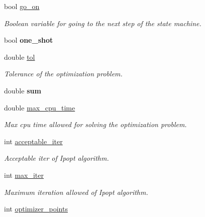 \begin{DoxyCompactItemize}
\mbox{\label{classSuperqComputation_ae4a1ef363106dd0847fbdfd8817153bb}} 
bool \mbox{\hyperlink{classSuperqComputation_ae4a1ef363106dd0847fbdfd8817153bb}{go\+\_\+on}}
\begin{DoxyCompactList}\small\item\em Boolean variable for going to the next step of the state machine. \end{DoxyCompactList}\item 
\mbox{\label{classSuperqComputation_aefd14b0b7c049f47da8bdfcbfae9601c}} 
bool {\bfseries one\+\_\+shot}
\item 
\mbox{\label{classSuperqComputation_af39fa3aba2711650375fda5772876824}} 
double \mbox{\hyperlink{classSuperqComputation_af39fa3aba2711650375fda5772876824}{tol}}
\begin{DoxyCompactList}\small\item\em Tolerance of the optimization problem. \end{DoxyCompactList}\item 
\mbox{\label{classSuperqComputation_ae7b9d547c797db0ce58966617036e048}} 
double {\bfseries sum}
\item 
\mbox{\label{classSuperqComputation_a7c6fad9fa4e90a3c4b43700ac425d784}} 
double \mbox{\hyperlink{classSuperqComputation_a7c6fad9fa4e90a3c4b43700ac425d784}{max\+\_\+cpu\+\_\+time}}
\begin{DoxyCompactList}\small\item\em Max cpu time allowed for solving the optimization problem. \end{DoxyCompactList}\item 
\mbox{\label{classSuperqComputation_ae62bf913e73a28fefde3ea86f422e83c}} 
int \mbox{\hyperlink{classSuperqComputation_ae62bf913e73a28fefde3ea86f422e83c}{acceptable\+\_\+iter}}
\begin{DoxyCompactList}\small\item\em Acceptable iter of Ipopt algorithm. \end{DoxyCompactList}\item 
\mbox{\label{classSuperqComputation_a0b957ecf11a17e5a57555151db1d2ac8}} 
int \mbox{\hyperlink{classSuperqComputation_a0b957ecf11a17e5a57555151db1d2ac8}{max\+\_\+iter}}
\begin{DoxyCompactList}\small\item\em Maximum iteration allowed of Ipopt algorithm. \end{DoxyCompactList}\item 
\mbox{\label{classSuperqComputation_ae7682e7de5241952a3d453d64bea6b4a}} 
int \mbox{\hyperlink{classSuperqComputation_ae7682e7de5241952a3d453d64bea6b4a}{optimizer\+\_\+points}}

\end{DoxyCompactItemize}
